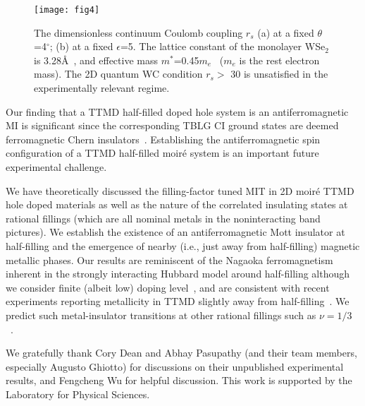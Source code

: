 \documentclass[aps,prl,floatfix,twocolumn]{revtex4-2}
\begin{document}
\begin{figure}[t]
	\centering
	\texttt{[image: fig4]}
	\caption{The dimensionless continuum Coulomb coupling $ r_s $ (a) at a fixed $ \theta$=4$ ^\circ $; (b) at a fixed $ \epsilon$=5. The lattice constant of the monolayer WSe$ _2 $ is 3.28\AA~\cite{kormanyos2015cdotp}, and effective mass $ m^*$=0.45$m_e $~\cite{fallahazad2016shubnikov} ($ m_e $ is the rest electron mass). The 2D quantum WC condition $ r_s>$ 30 is {unsatisfied} in the experimentally relevant regime.}
	\label{fig:fig4}
\end{figure}

Our finding that a TTMD half-filled doped hole system is an antiferromagnetic {MI} is {significant} since the corresponding TBLG {CI} ground states are {deemed} ferromagnetic Chern insulators~\cite{sharpe2019emergent,serlin2020intrinsic,wu2020collective,wu2020quantum,bultinck2020mechanism,alavirad2020ferromagnetism}. Establishing the antiferromagnetic spin configuration of a TTMD half-filled moir\'e system is an important future experimental challenge.

We have theoretically discussed the filling-factor tuned {MIT} in 2D moir\'e TTMD hole doped materials {as well as the nature of the correlated insulating states at rational fillings (which are all nominal metals in the noninteracting band pictures)}. We establish the existence of an antiferromagnetic Mott insulator at half-filling and the emergence of nearby (i.e., just away from half-filling) magnetic metallic phases. Our results are reminiscent of the Nagaoka ferromagnetism inherent in the strongly interacting Hubbard model around half-filling although we consider finite (albeit low) doping level~\cite{nagaoka1966ferromagnetism},{ and are consistent with recent experiments reporting metallicity in TTMD slightly away from half-filling~\cite{ghiotto2021quantum,li2021continuous}. We predict such metal-insulator transitions at other rational fillings such as $\nu=1/3$ ~\cite{MI_SM}.}


We gratefully thank Cory Dean and Abhay Pasupathy (and their team members, {especially Augusto Ghiotto}) for discussions on their unpublished experimental results, {and Fengcheng Wu for helpful discussion}.  This work is supported by the Laboratory for Physical Sciences.




\end{document}
